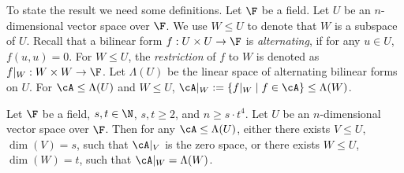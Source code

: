 To state the result we need some definitions. Let $\F$ be a field. 
Let $U$ be an $n$-dimensional vector space over $\F$. We use $W\leq U$ to 
denote that $W$ is a subspace of $U$. Recall that a bilinear form $f:U\times U\to 
\F$ is \emph{alternating}, if for any $u\in U$, $f(u, u)=0$. For $W\leq U$, the 
\emph{restriction} of $f$ to $W$ is denoted as $f|_W:W\times W\to \F$. 
Let $\Lambda(U)$ be the linear space of alternating bilinear forms on $U$. For 
$\cA\leq \Lambda(U)$ and $W\leq U$, $\cA|_W:=\{f|_W\mid f\in \cA\}\leq\Lambda(W)$. 

\begin{theorem}\label{thm:main}
Let $\F$ be a field, $s, t\in \N$, $s, t\geq 2$, and $n\geq s\cdot t^4$. Let $U$ 
be an $n$-dimensional vector space over $\F$. Then for any 
$\cA\leq\Lambda(U)$, either there exists $V\leq U$, $\dim(V)=s$, such that 
$\cA|_V$ is the zero space, or there exists $W\leq U$, $\dim(W)=t$, such that 
$\cA|_W=\Lambda(W)$. 
\end{theorem}
